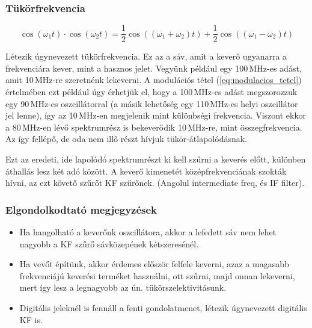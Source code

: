 \documentclass[12pt,a4paper]{article}
\begin{document}
\subsubsection{Tükörfrekvencia}
\begin{equation}
    \cos \left( \omega_{1} t \right) \cdot \cos \left( \omega_{2} t \right) = 
    \frac{1}{2} \cos \left( \left( \omega_{1} + \omega_{2} \right) t \right) + \frac{1}{2} \cos \left( \left( \omega_{1} - \omega_{2} \right) t \right)
    \label{eq:modulacios_tetel}
\end{equation}

Létezik úgynevezett tükörfrekvencia. Ez az a sáv, amit a keverő ugyanarra a frekvenciára kever, mint a hasznos jelet. Vegyünk például egy 100\,MHz-es adást, amit 10\,MHz-re szeretnénk lekeverni. A modulációs tétel (\ref{eq:modulacios_tetel}) értelmében ezt például úgy érhetjük el, hogy a 100\,MHz-es adást megszorozzuk egy 90\,MHz-es oszcillátorral (a másik lehetőség egy 110\,MHz-es helyi oszcillátor jel lenne), így az 10\,MHz-en megjelenik mint különbségi frekvencia. Viszont ekkor a 80\,MHz-en lévő spektrumrész is bekeverődik 10\,MHz-re, mint összegfrekvencia. Az így fellépő, de oda nem illő részt hívjuk tükör-átlapolódásnak.

Ezt az eredeti, ide lapolódó spektrumrészt ki kell szűrni a keverés előtt, különben áthallás lesz két adó között. A keverő kimenetét középfrekvenciának szokták hívni, az ezt követő szűrőt KF szűrőnek. (Angolul intermediate freq, és IF filter).

\subsubsection{Elgondolkodtató megjegyzések}
\begin{itemize}
    \item Ha hangolható a keverőnk oszcillátora, akkor a lefedett sáv nem lehet nagyobb a KF szűrő sávközepének kétszeresénél.
    \item Ha vevőt építünk, akkor érdemes először felfele keverni, azaz a magasabb frekvenciájú keverési terméket használni, ott szűrni, majd onnan lekeverni, mert így lesz a legnagyobb az ún. tükörszelektivitásunk.
    \item    Digitális jeleknél is fennáll a fenti gondolatmenet, létezik úgynevezett digitális KF is.

\end{itemize}
\end{document}
